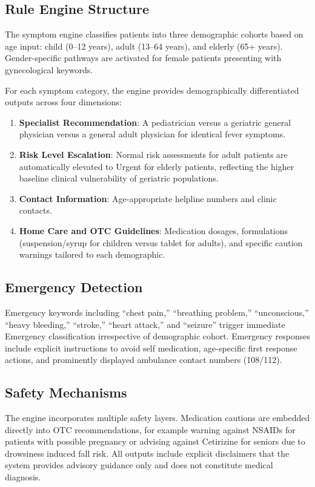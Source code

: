 \documentclass[conference]{IEEEtran}
\begin{document}
\subsection{Rule Engine Structure}

The symptom engine classifies patients into three demographic cohorts based on age input: child (0--12 years), adult (13--64 years), and elderly (65+ years). Gender-specific pathways are activated for female patients presenting with gynecological keywords.

For each symptom category, the engine provides demographically differentiated outputs across four dimensions:

\begin{enumerate}
\item \textbf{Specialist Recommendation}: A pediatrician versus a geriatric general physician versus a general adult physician for identical fever symptoms.
\item \textbf{Risk Level Escalation}: Normal risk assessments for adult patients are automatically elevated to Urgent for elderly patients, reflecting the higher baseline clinical vulnerability of geriatric populations.
\item \textbf{Contact Information}: Age-appropriate helpline numbers and clinic contacts.
\item \textbf{Home Care and OTC Guidelines}: Medication dosages, formulations (suspension/syrup for children versus tablet for adults), and specific caution warnings tailored to each demographic.
\end{enumerate}

\subsection{Emergency Detection}

Emergency keywords including ``chest pain,'' ``breathing problem,'' ``unconscious,'' ``heavy bleeding,'' ``stroke,'' ``heart attack,'' and ``seizure'' trigger immediate Emergency classification irrespective of demographic cohort. Emergency responses include explicit instructions to avoid self medication, age-specific first response actions, and prominently displayed ambulance contact numbers (108/112).

\subsection{Safety Mechanisms}

The engine incorporates multiple safety layers. Medication cautions are embedded directly into OTC recommendations, for example warning against NSAIDs for patients with possible pregnancy or advising against Cetirizine for seniors due to drowsiness induced fall risk. All outputs include explicit disclaimers that the system provides advisory guidance only and does not constitute medical diagnosis.
\end{document}

